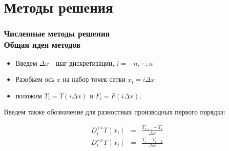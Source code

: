 \documentclass[hyperref={unicode=true},professionalfont]{beamer}
\newcommand{\stamp}{
	\begin{frame}[plain,noframenumbering]
		\begin{table}[h!]
			\flushright
			\vspace{5cm}
			\begin{adjustbox}{max width=0.7\textwidth}
				\begin{tabular}{
					|>{\footnotesize}p{0.8cm}|
					>{\footnotesize}p{0.8cm}|
					>{\footnotesize}p{2.2cm}|
					>{\footnotesize}p{1.1cm}|
					>{\footnotesize}p{0.8cm}|
					>{\footnotesize}p{5cm}|
					>{\footnotesize}p{0.1cm}|
					>{\footnotesize}p{0.1cm}|
					>{\footnotesize}p{0.1cm}|
					>{\footnotesize}p{0.8cm}|
					>{\footnotesize}p{1.4cm}|
				}
					\hline
					&&&&& \multicolumn{6}{>{\footnotesize}c|}{\multirow{3}{*}{\Large 0.043.00.00 ПЗ}} \\ \cline{1-5}
					&&&&& \multicolumn{6}{>{\footnotesize}c|}{} \\ \cline{1-5}
					Изм. & Лист & № Документа & Подпись & Дата & \multicolumn{6}{>{\footnotesize}c|}{} \\ \hline
					\multicolumn{2}{|>{\footnotesize}l|}{Разработал}
                    & Апанович Д.В. &  &  &
                                            \multirow{4}{5cm}{\centering
                                            Параллельный алгоритм
                                            численного решения
                                            анизотропного уравнения эйконала} & \multicolumn{3}{>{\footnotesize}l|}{Лит.} & Лист & Листов \\ \cline{1-5}\cline{7-11}
					\multicolumn{2}{|>{\footnotesize}l|}{Проверил}
                    & Казаков А.Л. &  &  &  & У & & & \insertframenumber & \inserttotalframenumber \\ \cline{1-5}\cline{7-11}
					\multicolumn{2}{|>{\footnotesize}l|}{Нормоконтролер}
                    & Казаков А.Л. &  &  &  & \multicolumn{5}{>{\footnotesize}l|}{} \\ \cline{1-5}
					\multicolumn{2}{|>{\footnotesize}l|}{} &  &  &  &  & \multicolumn{5}{>{\footnotesize}l|}{Кафедра АС, гр. ИСТм-16-1} \\ \cline{1-5}
					\multicolumn{2}{|>{\footnotesize}l|}{Утвердил}
                    & Бахвалов С.В. &  &  &  & \multicolumn{5}{>{\footnotesize}l|}{} \\ \hline

				\end{tabular}
			\end{adjustbox}
		\end{table}

	\end{frame}
}
\renewcommand{\stamp}{}
\begin{document}



\section{Методы решения}

\begin{frame}
  \frametitle{Численные методы решения\\Общая идея методов}
  \begin{itemize}
    \item Введем $\Delta x$ - шаг дискретизации, $i = -n, \cdots, n$
  \item Разобьем ось $x$ на набор точек сетки
    $x_i=i\Delta x$
  \item положим $T_{i} = T(i \Delta x)$ и
    $F_{i} = F(i \Delta x)$.

  \end{itemize}
  Введем также обозначение для разностных производных первого порядка:

  \begin{eqnarray}
    D^{+x}_iT(x_i) &=& \frac{T_{i+1} - T_{i}}{\Delta x} \\
    D^{-x}_iT(x_i) &=& \frac{T_{i} - T_{i-1}}{\Delta x}
  \end{eqnarray}

\end{frame}
\stamp
\end{document}
